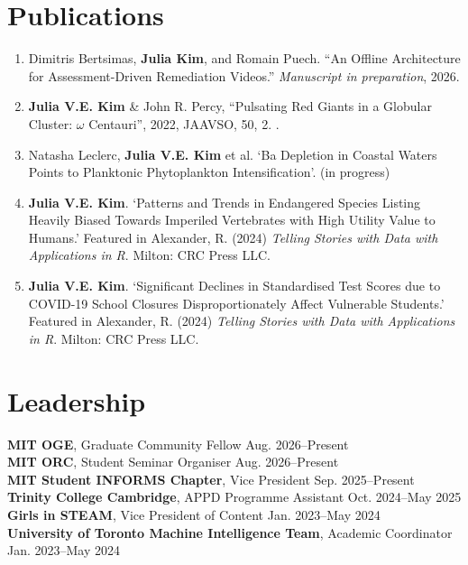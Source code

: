 \documentclass[10pt, letterpaper]{article}
\newenvironment{onecolentry}{
    \begin{adjustwidth}{
    }{
    }
}{
    \end{adjustwidth}
} %
\let\hrefWithoutArrow\href
\renewcommand{\href}[2]{\hrefWithoutArrow{#1}{\ifthenelse{\equal{#2}{}}{ }{#2 }\raisebox{.15ex}{\footnotesize \faExternalLink*}}}
\newcommand{\lightfont}[1]{{\fontseries{l}\selectfont #1}}
\begin{document}
    \section{Publications}
    \begin{enumerate}[noitemsep, topsep=0pt, leftmargin=15pt]
    \item Dimitris Bertsimas, \textbf{Julia Kim}, and Romain Puech.
``An Offline Architecture for Assessment-Driven Remediation Videos.''
\textit{Manuscript in preparation}, 2026.
    \item \textbf{Julia V.E. Kim} \& John R. Percy, ``Pulsating Red Giants in a Globular Cluster: $\omega$ Centauri'', 2022, JAAVSO, 50, 2. \href{https://app.aavso.org/media/jaavso/3835\_Skfwez7.pdf}{Link}.
    \item Natasha Leclerc, \textbf{Julia V.E. Kim} et al. `Ba Depletion in Coastal Waters Points to Planktonic Phytoplankton Intensification'. (\lightfont{in progress})
    \item \textbf{Julia V.E. Kim}. `Patterns and Trends in Endangered Species Listing Heavily Biased Towards Imperiled Vertebrates with High Utility Value to Humans.' Featured in Alexander, R. (2024) \textit{Telling Stories with Data with Applications in R}. Milton: CRC Press LLC. \href{https://github.com/julia-ve-kim/US_Climate_Change_Biodiversity/blob/main/paper/paper.pdf}{Link.}
    \item \textbf{Julia V.E. Kim}. `Significant Declines in Standardised Test Scores due to COVID-19 School Closures Disproportionately Affect Vulnerable Students.' Featured in Alexander, R. (2024) \textit{Telling Stories with Data with Applications in R}. Milton: CRC Press LLC. \href{https://github.com/juliavekim/COVID19_School_Closures/blob/main/paper/paper.pdf}{Link.}
    \end{enumerate}
\vspace{-0.1cm}
\section{Leadership}
\begin{onecolentry}
\textbf{MIT OGE}, Graduate Community Fellow \hfill Aug. 2026--Present\\
\textbf{MIT ORC}, Student Seminar Organiser \hfill Aug. 2026--Present\\
\textbf{MIT Student INFORMS Chapter}, Vice President \hfill Sep. 2025--Present\\
\textbf{Trinity College Cambridge}, APPD Programme Assistant \hfill{Oct. 2024--May 2025} \\
\textbf{Girls in STEAM}, Vice President of Content \hfill Jan. 2023--May 2024 \\
\textbf{University of Toronto Machine Intelligence Team}, Academic Coordinator \hfill Jan. 2023--May 2024 \\
\end{onecolentry}
\vspace{-0.4cm}
\end{document}
